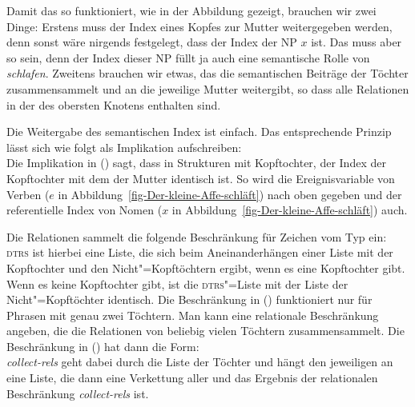 Damit das so funktioniert, wie in der Abbildung gezeigt, brauchen wir zwei Dinge: Erstens muss der
Index eines Kopfes zur Mutter weitergegeben werden, denn sonst wäre nirgends festgelegt, dass der
Index der NP $x$ ist. Das muss aber so sein, denn der Index dieser NP füllt ja auch eine semantische
Rolle von \emph{schlafen}. Zweitens brauchen wir etwas, das die semantischen Beiträge der Töchter
zusammensammelt und an die jeweilige Mutter weitergibt, so dass alle Relationen in der \relsl
des obersten Knotens enthalten sind.

Die Weitergabe des semantischen Index ist einfach. Das entsprechende Prinzip lässt sich wie folgt als Implikation
aufschreiben:
\ea
{} \impl\\
\z
{}
Die Implikation in () sagt, dass in Strukturen mit Kopftochter, der Index der Kopftochter mit
dem der Mutter identisch ist. So wird die Ereignisvariable von Verben ($e$ in Abbildung~\ref{fig-Der-kleine-Affe-schläft}) nach oben gegeben und der
referentielle Index von Nomen ($x$ in Abbildung~\ref{fig-Der-kleine-Affe-schläft}) auch.

Die Relationen sammelt die folgende Beschränkung für Zeichen vom Typ  ein:
\ea
{} \impl\\
\z
\textsc{dtrs} ist hierbei eine Liste, die sich beim Aneinanderhängen einer Liste mit der Kopftochter
und den Nicht"=Kopftöchtern ergibt, wenn es eine Kopftochter gibt. Wenn es keine Kopftochter gibt,
ist die \textsc{dtrs}"=Liste mit der Liste der Nicht"=Kopftöchter identisch. Die Beschränkung in
() funktioniert nur für Phrasen mit genau zwei Töchtern. Man kann eine relationale
Beschränkung angeben, die die Relationen von beliebig vielen Töchtern zusammensammelt. Die
Beschränkung in () hat dann die Form:
\ea
{} \impl\\
\z
{}
\emph{collect-rels} geht dabei durch die Liste der Töchter und hängt den jeweiligen \relsw an eine
Liste, die dann eine Verkettung aller \relswe und das Ergebnis der relationalen Beschränkung
\emph{collect-rels} ist.


